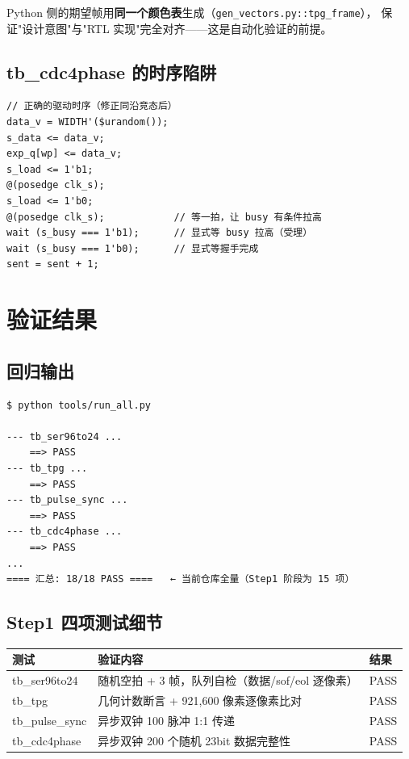Python 侧的期望帧用\textbf{同一个颜色表}生成（\texttt{gen\_vectors.py::tpg\_frame}），
保证"设计意图"与"RTL 实现"完全对齐——这是自动化验证的前提。

\subsection{tb\_cdc4phase 的时序陷阱}

\begin{Verbatim}[frame=single,fontsize=\small]
// 正确的驱动时序（修正同沿竞态后）
data_v = WIDTH'($urandom());
s_data <= data_v;
exp_q[wp] <= data_v;
s_load <= 1'b1;
@(posedge clk_s);
s_load <= 1'b0;
@(posedge clk_s);            // 等一拍，让 busy 有条件拉高
wait (s_busy === 1'b1);      // 显式等 busy 拉高（受理）
wait (s_busy === 1'b0);      // 显式等握手完成
sent = sent + 1;
\end{Verbatim}

\section{验证结果}

\subsection{回归输出}

\begin{Verbatim}[frame=single,fontsize=\small]
$ python tools/run_all.py

--- tb_ser96to24 ...
    ==> PASS
--- tb_tpg ...
    ==> PASS
--- tb_pulse_sync ...
    ==> PASS
--- tb_cdc4phase ...
    ==> PASS
...
==== 汇总: 18/18 PASS ====   ← 当前仓库全量（Step1 阶段为 15 项）
\end{Verbatim}

\subsection{Step1 四项测试细节}

\begin{center}
\renewcommand{\arraystretch}{1.25}
\begin{tabular}{lll}
\toprule
\textbf{测试} & \textbf{验证内容} & \textbf{结果} \\
\midrule
tb\_ser96to24 & 随机空拍 + 3 帧，队列自检（数据/sof/eol 逐像素） & PASS \\
tb\_tpg & 几何计数断言 + 921,600 像素逐像素比对 & PASS \\
tb\_pulse\_sync & 异步双钟 100 脉冲 1:1 传递 & PASS \\
tb\_cdc4phase & 异步双钟 200 个随机 23bit 数据完整性 & PASS \\
\bottomrule
\end{tabular}
\end{center}

